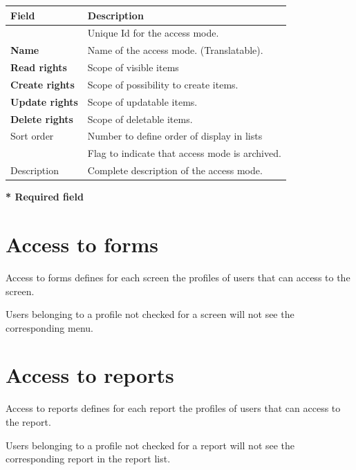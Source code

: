 \documentclass[letterpaper,10pt,english]{sphinxmanual}
\begin{document}
\begin{tabulary}{\linewidth}{|l|l|}
\hline
\textsf{\relax 
Field
} & \textsf{\relax 
Description
}\\
\hline
{\hyperref[Glossary:term-id]{\emph{}}}
 & 
Unique Id for the access mode.
\\
\hline
\textbf{Name}
 & 
Name of the access mode. (Translatable).
\\
\hline
\textbf{Read rights}
 & 
Scope of visible items
\\
\hline
\textbf{Create rights}
 & 
Scope of possibility to create items.
\\
\hline
\textbf{Update rights}
 & 
Scope of updatable items.
\\
\hline
\textbf{Delete rights}
 & 
Scope of deletable items.
\\
\hline
Sort order
 & 
Number to define order of display in lists
\\
\hline
{\hyperref[Glossary:term-closed]{\emph{}}}
 & 
Flag to indicate that access mode is archived.
\\
\hline
Description
 & 
Complete description of the access mode.
\\
\hline\end{tabulary}


\textbf{* Required field}
\newpage
{}

\section{Access to forms}
\label{AccessRights:access-to-forms}\label{AccessRights:index-2}
Access to forms defines for each screen the profiles of users that can access to the screen.

Users belonging to a profile not checked for a screen will not see the corresponding menu.


\section{Access to reports}
\label{AccessRights:access-to-reports}\label{AccessRights:index-3}
Access to reports defines for each report the profiles of users that can access to the report.

Users belonging to a profile not checked for a report will not see the corresponding report in the report list.
\end{document}
